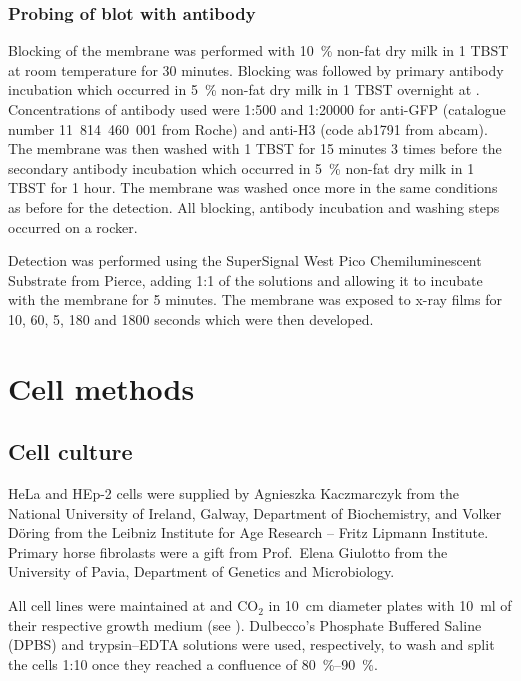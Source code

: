       \subsubsection{Probing of blot with antibody}
        Blocking of the membrane was performed with \SI{10}{\percent}
        non-fat dry milk in \SI{1}{\X} TBST
        at room temperature for 30 minutes. Blocking was followed by
        primary antibody incubation which occurred in \SI{5}{\percent} non-fat
        dry milk in \SI{1}{\X} TBST overnight at . Concentrations of
        antibody used were 1:500 and 1:20000 for anti-GFP (catalogue
        number 11~814~460~001 from Roche) and anti-H3 (code ab1791 from
        abcam). The membrane was then washed with \SI{1}{\X} TBST for
        15 minutes 3 times before the secondary antibody incubation which
        occurred in \SI{5}{\percent} non-fat dry milk in \SI{1}{\X} TBST for
        1 hour. The membrane was washed once more in the same
        conditions as before for the detection. All blocking, antibody
        incubation and washing steps occurred on a rocker.

        Detection was performed using the SuperSignal West Pico Chemiluminescent
        Substrate from Pierce, adding 1:1 of the solutions and allowing it to incubate
        with the membrane for 5 minutes. The membrane was exposed to x-ray films for
        10, 60, 5, 180 and 1800 seconds which were then developed.


  \section{Cell methods}
    \subsection{Cell culture}
      HeLa and HEp-2 cells were supplied by Agnieszka Kaczmarczyk from the
      National University of Ireland, Galway, Department of Biochemistry,
      and Volker D\"oring from the Leibniz Institute for Age Research -- Fritz Lipmann Institute.
      Primary horse fibrolasts were a gift from Prof.~Elena Giulotto from the
      University of Pavia, Department of Genetics and Microbiology.

      All cell lines were maintained at  and  CO$_2$ in \SI{10}{\cm}
      diameter plates with \SI{10}{\ml} of their respective growth medium (see ).
      Dulbecco's Phosphate Buffered
      Saline (DPBS) and trypsin--EDTA solutions were used, respectively, to wash
      and split the cells 1:10 once they reached a confluence of \SIrange{80}{90}{\percent}.

